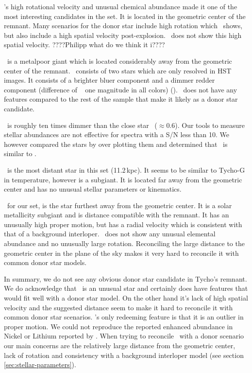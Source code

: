 \starb's high rotational velocity and unusual chemical abundance made it one of the most interesting candidates in the set. It is located in the geometric center of the remnant. Many scenarios for the donor star include high rotation which \starb\ shows, but also include a high spatial velocity post-explosion. \starb\ does not show this high spatial velocity. ????Philipp what do we think it i????

\starc\ is a metalpoor giant which is located considerably away from the geometric center of the remnant. \starc\ consists of two stars which are only resolved in HST images. It consists of a brighter bluer component and a dimmer redder component (difference of ~ one magnitude in all colors) (\rl). \starc\ does not have any features compared to the rest of the sample that make it likely as a donor star candidate.

\stard\ is roughly ten times dimmer than the close star \starc\ ($\approx 0.6$\arcsec). Our tools to measure stellar abundances are not effective for spectra with a S/N less than 10. We however compared the stars by over plotting them and determined that \stard\ is similar to \starc. 

\stare\ is the most distant star in this set (11.2\,kpc). It seems to be similar to  Tycho-G in temperature, however is a subgiant. It is located far away from the geometric center and has no unusual stellar parameters or kinematics.

\starg\, for our set, is the star furthest away from the geometric center. It is a solar metallicity subgiant and is distance compatible with the remnant. It has an unusually high proper motion, but has a radial velocity which is consistent with that of a background interloper. \starg\ does not show any unusual elemental abundance and no unusually large rotation. Reconciling the large distance to the geometric center in the plane of the sky makes it very hard to reconcile it with common donor star models.

In summary, we do not see any obvious donor star candidate in Tycho's remnant. We do acknowledge that \starb\ is an unusual star and certainly does have features that would fit well with a donor star model. On the other hand it's lack of high spatial velocity and the suggested distance seem to make it hard to reconcile it with common donor star scenarios. 
\starg's only redeeming feature is that it is an outlier in proper motion. We could not reproduce the reported enhanced abundance in Nickel or Lithium reported by \gh. When trying to reconcile \starg\ with a donor scenario our main concerns are the relatively large distance from the geometric center, lack of rotation and consistency with a background interloper model (see section \ref{sec:stellar-parameters}).

